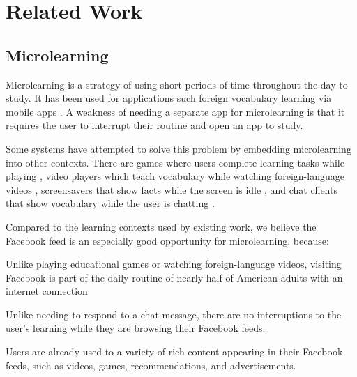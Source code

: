 \documentclass{chi-ext}
\begin{document}
\section{Related Work}

\subsection{Microlearning}

Microlearning is a strategy of using short periods of time throughout the day to study. It has been used for applications such foreign vocabulary learning via mobile apps \cite{microlearning} \cite{micromandarin}. A weakness of needing a separate app for microlearning is that it requires the user to interrupt their routine and open an app to study. %

Some systems have attempted to solve this problem by embedding microlearning into other contexts. There are games where users complete learning tasks while playing \cite{carriearcade}, video players which teach vocabulary while watching foreign-language videos \cite{smartsubtitles}, screensavers that show facts while the screen is idle \cite{screensaver}, and chat clients that show vocabulary while the user is chatting \cite{waitlearning}.

Compared to the learning contexts used by existing work, we believe the Facebook feed is an especially good opportunity for microlearning, because:

\begin{compactitem}
\item Unlike playing educational games or watching foreign-language videos, visiting Facebook is part of the daily routine of nearly half of American adults with an internet connection \cite{socialmediaupdate} %
\item Unlike needing to respond to a chat message, there are no interruptions to the user's learning while they are browsing their Facebook feeds.
\item Users are already used to a variety of rich content appearing in their Facebook feeds, such as videos, games, recommendations, and advertisements.
\end{compactitem}
\end{document}
